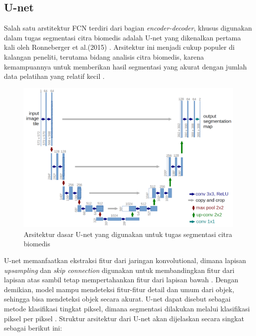 \subsection{U-net}

\noindent Salah satu arstitektur FCN terdiri dari bagian \textit{encoder-decoder}, khusus digunakan dalam tugas segmentasi citra biomedis adalah U-net yang dikenalkan pertama kali oleh Ronneberger et al.(2015) \cite{ronneberger_u-net_2015}. Arsitektur ini menjadi cukup populer di kalangan peneliti, terutama bidang analisis citra biomedis, karena kemampuannya untuk memberikan hasil segmentasi yang akurat dengan jumlah data pelatihan yang relatif kecil \cite{williams_unified_2023}.

\begin{figure}[H]
	\centering
	\includegraphics[scale=.2]{gambar/U-net.png}
	\caption{Arsitektur dasar U-net yang digunakan untuk tugas segmentasi citra biomedis}
	\label{fig:U-net}
\end{figure}

\noindent U-net memanfaatkan ekstraksi fitur dari jaringan konvolutional, dimana lapisan \textit{upsampling} dan \textit{skip connection} digunakan untuk membandingkan fitur dari lapisan atas sambil tetap mempertahankan fitur dari lapisan bawah \cite{huang_fully_2022}. Dengan demikian, model mampu mendeteksi fitur-fitur detail dan umum dari objek, sehingga bisa mendeteksi objek secara akurat. U-net dapat disebut sebagai metode klasifikasi tingkat piksel, dimana segmentasi dilakukan melalui klasifikasi piksel per piksel \cite{siddique_u-net_2020}. Struktur arsitektur dari U-net akan dijelaskan secara singkat sebagai berikut ini:

